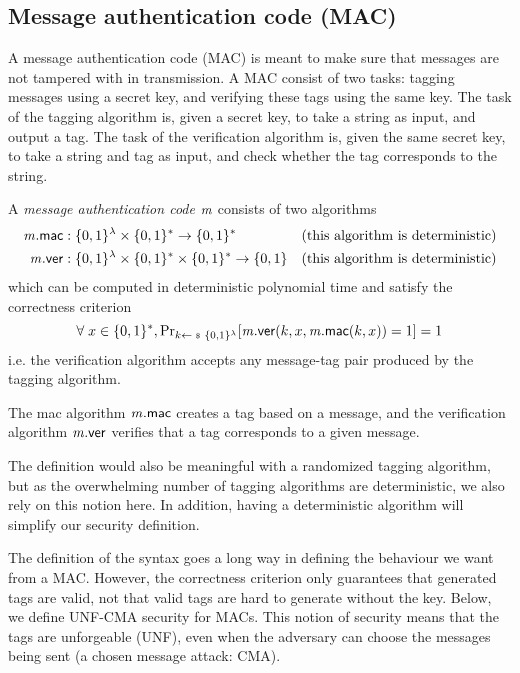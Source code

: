 \newpage
\subsection{Message authentication code (MAC)}\label{ssec:mac-definition}
A message authentication code (MAC) is meant to make sure that messages are not tampered with in transmission. A MAC consist of two tasks: tagging messages using a secret key, and verifying these tags using the same key. The task of the tagging algorithm is, given a secret key, to take a string as input, and output a tag. The task of the verification algorithm is, given the same secret key, to take a string and tag as input, and check whether the tag corresponds to the string.

\begin{syntax}\label{syntax:mac}
  A \emph{message authentication code} $\mathit{{m}}$ consists of two algorithms
  \begin{align*}
    \mathit{{m}}.\mathsf{mac} &: \{0,1\}^\lambda \times \{0,1\}^* \rightarrow \{0,1\}^* &\text{(this algorithm is deterministic)}\\
    \mathit{{m}}.\mathsf{ver} &: \{0,1\}^\lambda \times \{0,1\}^* \times \{0,1\}^* \rightarrow \{0,1\} &\text{(this algorithm is deterministic)}
  \end{align*}
  which can be computed in deterministic polynomial time and satisfy the correctness criterion
  \[\forall\;x\in\bin^*, \probsub{k\sample\bin^\lambda}{\m.\verify(k,x,\m.\mac(k,x))=1}=1\]
  i.e. the verification algorithm accepts any message-tag pair produced by the tagging algorithm.
\end{syntax}

\begin{remark}
  The mac algorithm $\mathit{{m}}.\mathsf{mac}$ creates a tag based on a message, and the verification algorithm $\mathit{{m}}.\mathsf{ver}$ verifies that a tag corresponds to a given message.
\end{remark}

\begin{remark}
  The definition would also be meaningful with a randomized tagging algorithm, but as the overwhelming number of tagging algorithms are deterministic, we also rely on this notion here. In addition, having a deterministic algorithm will simplify our security definition.
\end{remark}

\begin{remark} The definition of the syntax goes a long way in defining the behaviour we want from a MAC. However, the correctness criterion only guarantees that generated tags are valid, not that valid tags are hard to generate without the key. Below, we define UNF-CMA security for MACs. This notion of security means that the tags are unforgeable (UNF), even when the adversary can choose the messages being sent (a chosen message attack: CMA).
\end{remark}

